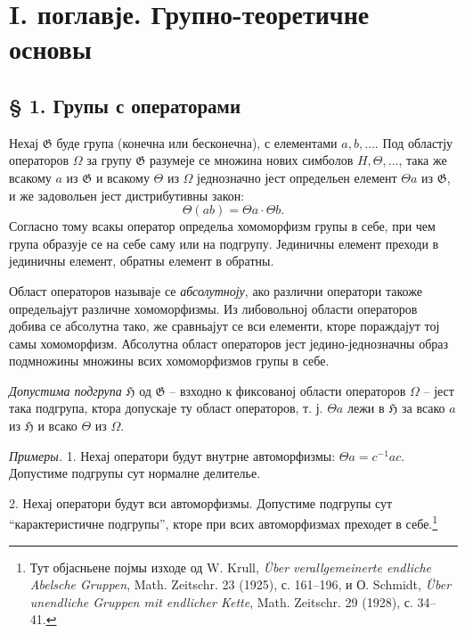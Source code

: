 ﻿\documentclass[11pt]{article}
\providecommand{\mG}{\mathfrak{G}}
\providecommand{\mH}{\mathfrak{H}}
\begin{document}
\setcounter{footnote}{5}

\section*{I. поглавје. Групно-теоретичне основы}

\subsection*{§ 1. Групы с операторами}

Нехај $\mG$ буде група (конечна или бесконечна), с елементами $a,b,\ldots$. Под областју операторов $\Omega$ за групу $\mG$ разумеје се множина нових симболов $H,\Theta,\ldots$, така же всакому $a$ из $\mG$ и всакому $\Theta$ из $\Omega$ једнозначно јест определьен елемент $\Theta a$ из $\mG$, и же задовольен јест дистрибутивны закон:
\[
        \Theta(ab)=\Theta a\cdot\Theta b.
\]
Согласно тому всакы оператор определьа хомоморфизм групы в себе, при чем група образује се на себе саму или на подгрупу. Јединичны елемент преходи в јединичны елемент, обратны елемент в обратны.

Област операторов называје се \emph{абсолутноју}, ако различни оператори такоже определьајут различне хомоморфизмы. Из либовольној области операторов добива се абсолутна тако, же сравньајут се вси елементи, кторе пораждајут тој самы хомоморфизм. Абсолутна област операторов јест једино-једнозначны образ подмножины множины всих хомоморфизмов групы в себе.

\emph{Допустима подгрупа} $\mH$ од $\mG$ -- взходно к фиксованој области операторов $\Omega$ -- јест така подгрупа, ктора допускаје ту област операторов, т. ј. $\Theta a$ лежи в $\mH$ за всако $a$ из $\mH$ и всако $\Theta$ из $\Omega$.

\emph{Примеры.} 1. Нехај оператори будут внутрне автоморфизмы: $\Theta a=c^{-1}ac$. Допустиме подгрупы сут нормалне делителье.

2. Нехај оператори будут вси автоморфизмы. Допустиме подгрупы сут “карактеристичне подгрупы”, кторе при всих автоморфизмах преходет в себе.\footnote{Тут објасньене појмы изходе од W. Krull, \emph{Über verallgemeinerte endliche Abelsche Gruppen}, Math. Zeitschr. 23 (1925), с. 161--196, и О. Schmidt, \emph{Über unendliche Gruppen mit endlicher Kette}, Math. Zeitschr. 29 (1928), с. 34--41.}
\end{document}
